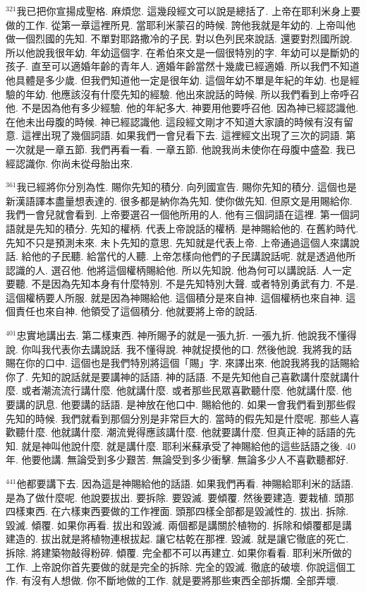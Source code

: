 \documentclass{book}
\begin{document}
$^{321}$我已把你宣揚成聖格.
麻煩您.
這幾段經文可以說是總括了.
上帝在耶利米身上要做的工作.
從第一章這裡所見.
當耶利米蒙召的時候.
誇他我就是年幼的.
上帝叫他做一個烈國的先知.
不單對耶路撒冷的子民.
對以色列民來說話.
還要對烈國所說.
所以他說我很年幼.
年幼這個字.
在希伯來文是一個很特別的字.
年幼可以是斷奶的孩子.
直至可以適婚年齡的青年人.
適婚年齡當然十幾歲已經適婚.
所以我們不知道他具體是多少歲.
但我們知道他一定是很年幼.
這個年幼不單是年紀的年幼.
也是經驗的年幼.
他應該沒有什麼先知的經驗.
他出來說話的時候.
所以我們看到上帝呼召他.
不是因為他有多少經驗.
他的年紀多大.
神要用他要呼召他.
因為神已經認識他.
在他未出母腹的時候.
神已經認識他.
這段經文剛才不知道大家讀的時候有沒有留意.
這裡出現了幾個詞語.
如果我們一會兒看下去.
這裡經文出現了三次的詞語.
第一次就是一章五節.
我們再看一看.
一章五節.
他說我尚未使你在母腹中盛盈.
我已經認識你.
你尚未從母胎出來.

$^{361}$我已經將你分別為性.
賜你先知的積分.
向列國宣告.
賜你先知的積分.
這個也是新漢語譯本盡量想表達的.
很多都是納你為先知.
使你做先知.
但原文是用賜給你.
我們一會兒就會看到.
上帝要選召一個他所用的人.
他有三個詞語在這裡.
第一個詞語就是先知的積分.
先知的權柄.
代表上帝說話的權柄.
是神賜給他的.
在舊約時代.
先知不只是預測未來.
未卜先知的意思.
先知就是代表上帝.
上帝通過這個人來講說話.
給他的子民聽.
給當代的人聽.
上帝怎樣向他們的子民講說話呢.
就是透過他所認識的人.
選召他.
他將這個權柄賜給他.
所以先知說.
他為何可以講說話.
人一定要聽.
不是因為先知本身有什麼特別.
不是先知特別大聲.
或者特別勇武有力.
不是.
這個權柄要人所服.
就是因為神賜給他.
這個積分是來自神.
這個權柄也來自神.
這個責任也來自神.
他領受了這個積分.
他就要將上帝的說話.

$^{401}$忠實地講出去.
第二樣東西.
神所賜予的就是一張九折.
一張九折.
他說我不懂得說.
你叫我代表你去講說話.
我不懂得說.
神就捉摸他的口.
然後他說.
我將我的話賜在你的口中.
這個也是我們特別將這個「賜」字.
來譯出來.
他說我將我的話賜給你了.
先知的說話就是要講神的話語.
神的話語.
不是先知他自己喜歡講什麼就講什麼.
或者潮流流行講什麼.
他就講什麼.
或者那些民眾喜歡聽什麼.
他就講什麼.
他要講的訊息.
他要講的話語.
是神放在他口中.
賜給他的.
如果一會我們看到那些假先知的時候.
我們就看到那個分別是非常巨大的.
當時的假先知是什麼呢.
那些人喜歡聽什麼.
他就講什麼.
潮流覺得應該講什麼.
他就要講什麼.
但真正神的話語的先知.
就是神叫他說什麼.
就是講什麼.
耶利米蘇承受了神賜給他的這些話語之後.
40年.
他要他講.
無論受到多少艱苦.
無論受到多少衝擊.
無論多少人不喜歡聽都好.

$^{441}$他都要講下去.
因為這是神賜給他的話語.
如果我們再看.
神賜給耶利米的話語.
是為了做什麼呢.
他說要拔出.
要拆除.
要毀滅.
要傾覆.
然後要建造.
要栽植.
頭那四樣東西.
在六樣東西要做的工作裡面.
頭那四樣全部都是毀滅性的.
拔出.
拆除.
毀滅.
傾覆.
如果你再看.
拔出和毀滅.
兩個都是講關於植物的.
拆除和傾覆都是講建造的.
拔出就是將植物連根拔起.
讓它枯乾在那裡.
毀滅.
就是讓它徹底的死亡.
拆除.
將建築物敲得粉碎.
傾覆.
完全都不可以再建立.
如果你看看.
耶利米所做的工作.
上帝說你首先要做的就是完全的拆除.
完全的毀滅.
徹底的破壞.
你說這個工作.
有沒有人想做.
你不斷地做的工作.
就是要將那些東西全部拆爛.
全部弄壞.
\end{document}
